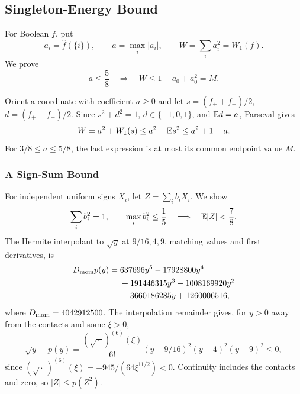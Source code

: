 \subsection{Singleton-Energy Bound}
\label{app:fourier-cap-proof}

For Boolean \(f\), put
\[
 a_i=\widehat f(\{i\}),\qquad a=\max_i|a_i|,\qquad
 W=\sum_i a_i^2=W_1(f).
\]
We prove
\begin{equation}
                 a\le\frac58
                 \quad\Longrightarrow\quad W\le 1-a_0+a_0^2=M.
 \label{eq:elementary-fourier-cap}
\end{equation}

Orient a coordinate with coefficient \(a\ge0\) and let
\(s=(f_++f_-)/2\), \(d=(f_+-f_-)/2\).
Since \(s^2+d^2=1\), \(d\in\{-1,0,1\}\), and \(\mathbb E d=a\), Parseval gives
\begin{equation}
 W=a^2+W_1(s)\le a^2+\mathbb E s^2\le a^2+1-a.
 \label{eq:elementary-singleton-section}
\end{equation}
For \(3/8\le a\le5/8\), the last expression is at most
its common endpoint value \(M\).

\subsubsection{A Sign-Sum Bound}

For independent uniform signs \(X_i\), let \(Z=\sum_i b_iX_i\). We show
\begin{equation}
 \sum_i b_i^2=1,\qquad \max_i b_i^2\le\frac15
 \quad\Longrightarrow\quad \mathbb E|Z|<\frac78.
 \label{eq:elementary-sign-sum}
\end{equation}
The Hermite interpolant to \(\sqrt y\) at \(9/16,4,9\), matching
values and first derivatives, is
\begin{equation}
 \begin{split}
 D_{\rm mom}p(y)={}&637696y^5-17928800y^4\\
                  &+191446315y^3-1008169920y^2\\
                  &+3660186285y+1260006516,
 \end{split}
 \label{eq:moment-majorant}
\end{equation}
where \(D_{\rm mom}=4042912500\).
The interpolation remainder gives, for \(y>0\) away from the contacts
and some \(\xi>0\),
\[
 \sqrt y-p(y)=\frac{(\sqrt{\,\cdot\,})^{(6)}(\xi)}{6!}
                (y-9/16)^2(y-4)^2(y-9)^2\le0,
\]
since \((\sqrt{\,\cdot\,})^{(6)}(\xi)=-945/(64\xi^{11/2})<0\).
Continuity includes the contacts and zero, so \(|Z|\le p(Z^2)\).

